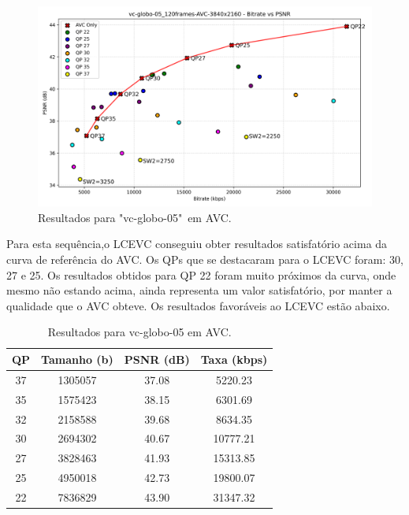 \begin{figure}[h]
    \centering
    \includegraphics[width=1.0\textwidth]{img/vc-globo-05_120frames-AVC.png}
    \caption{Resultados para "vc-globo-05"\ em \acrshort{AVC}. \cite{globo_video_uhd}}
    \label{fig:vc-globo-05}
\end{figure}

Para esta sequência,o \acrshort{LCEVC} conseguiu obter resultados satisfatório acima da curva
de referência do \acrshort{AVC}. Os QPs que se destacaram para o \acrshort{LCEVC} foram: 30,
27 e 25. Os resultados obtidos para QP 22 foram muito próximos da curva, onde mesmo não estando
acima, ainda representa um valor satisfatório, por manter a qualidade que o \acrshort{AVC} obteve.
Os resultados favoráveis ao \acrshort{LCEVC} estão abaixo.

\begin{table}[h]
    \centering
    \begin{tabular}{|c|c|c|c|}
        \hline
        \textbf{QP} & \textbf{Tamanho (b)} & \textbf{PSNR (dB)} & \textbf{Taxa (kbps)} \\
        \hline
        37 & 1305057 & 37.08 & 5220.23 \\
        35 & 1575423 & 38.15 & 6301.69 \\
        32 & 2158588 & 39.68 & 8634.35 \\
        30 & 2694302 & 40.67 & 10777.21 \\
        27 & 3828463 & 41.93 & 15313.85 \\
        25 & 4950018 & 42.73 & 19800.07 \\
        22 & 7836829 & 43.90 & 31347.32 \\
        \hline
    \end{tabular}
    \caption{Resultados para vc-globo-05 em AVC.}
    \label{tab:vc-globo-05-avc}
\end{table}

